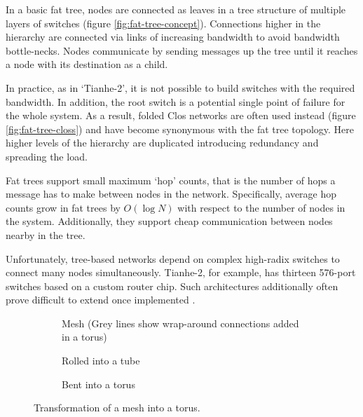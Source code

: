 				In a basic fat tree, nodes are connected as leaves in a tree structure
				of multiple layers of switches (figure \ref{fig:fat-tree-concept}).
				Connections higher in the hierarchy are connected via links of
				increasing bandwidth to avoid bandwidth bottle-necks.  Nodes communicate
				by sending messages up the tree until it reaches a node with its
				destination as a child.
				
				In practice, as in `Tianhe-2', it is not possible to build switches with
				the required bandwidth. In addition, the root switch is a potential
				single point of failure for the whole system. As a result, folded Clos
				networks are often used instead (figure \ref{fig:fat-tree-closs}) and
				have become synonymous with the fat tree topology. Here higher levels of
				the hierarchy are duplicated introducing redundancy and spreading the
				load.
				
				Fat trees support small maximum `hop' counts, that is the number of hops
				a message has to make between nodes in the network. Specifically,
				average hop counts grow in fat trees by $O(\log{N})$ with respect to the
				number of nodes in the system. Additionally, they support cheap
				communication between nodes nearby in the tree.
				
				Unfortunately, tree-based networks depend on complex high-radix switches
				to connect many nodes simultaneously.  Tianhe-2, for example, has
				thirteen 576-port switches based on a custom router chip. Such
				architectures additionally often prove difficult to extend once
				implemented \cite{dally04}.
				
				\begin{figure}
					\begin{subfigure}[t]{\textwidth}
						\center
						
						\caption{Mesh (Grey lines show wrap-around connections added in a
						torus)}
						\label{fig:torus-flat}
					\end{subfigure}
					
					\vspace{1em}
					
					\begin{subfigure}[t]{\textwidth}
						\center
						
						\caption{Rolled into a tube}
						\label{fig:torus-pipe}
					\end{subfigure}
					
					\vspace{1em}
					
					\begin{subfigure}[t]{\textwidth}
						\center
						
						\caption{Bent into a torus}
						\label{fig:torus-3D}
					\end{subfigure}
					
					\caption{Transformation of a mesh into a torus.}
					\label{fig:forming-a-torus}
				\end{figure}
			
